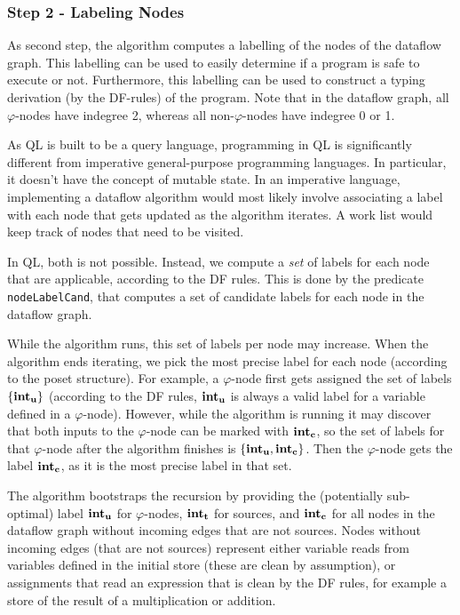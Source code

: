\subsubsection*{Step 2 - Labeling Nodes}
As second step, the algorithm computes a labelling of the nodes of the dataflow graph.
This labelling can be used to easily determine if a program is safe to execute or not.
Furthermore, this labelling can be used to construct a typing derivation (by the DF-rules)
of the program.
Note that in the dataflow graph, all $\varphi$-nodes have indegree 2, whereas all
non-$\varphi$-nodes have indegree 0 or 1.

As QL is built to be a query language, programming in QL is significantly different
from imperative general-purpose programming languages.
In particular, it doesn't have the concept of mutable state.
In an imperative language, implementing a dataflow algorithm would most
likely involve associating a label with each node that gets updated as the 
algorithm iterates.
A work list would keep track of nodes that need to be visited.

In QL, both is not possible.
Instead, we compute a \emph{set} of labels for each node that are applicable, according
to the DF rules.
This is done by the predicate \texttt{nodeLabelCand}, that computes a set of candidate labels 
for each node in the dataflow graph.

While the algorithm runs, this set of labels per node may increase.
When the algorithm ends iterating, we pick the most precise label for each node
(according to the poset structure).
For example, a $\varphi$-node first gets assigned the set of labels $\{\textbf{int}_\textbf{u}\}$
(according to the DF rules, $\textbf{int}_\textbf{u}$ is always a valid label for a variable defined
in a $\varphi$-node).
However, while the algorithm is running it may discover that both inputs to the 
$\varphi$-node can be marked with $\textbf{int}_\textbf{c}$, so the set of labels for that $\varphi$-node
after the algorithm finishes is $\{\textbf{int}_\textbf{u}, \textbf{int}_\textbf{c}\}$.
Then the $\varphi$-node gets the label $\textbf{int}_\textbf{c}$, as it is the most precise label
in that set.

The algorithm bootstraps the recursion by providing the (potentially sub-optimal)
label $\textbf{int}_\textbf{u}$ for $\varphi$-nodes, 
$\textbf{int}_\textbf{t}$ for sources, and $\textbf{int}_\textbf{c}$ for all nodes in the dataflow graph without
incoming edges that are not sources.
Nodes without incoming edges (that are not sources) represent either variable reads 
from variables defined in the initial store (these are clean by assumption), or 
assignments that read an expression that is clean by the DF rules, for example
a store of the result of a multiplication or addition.

